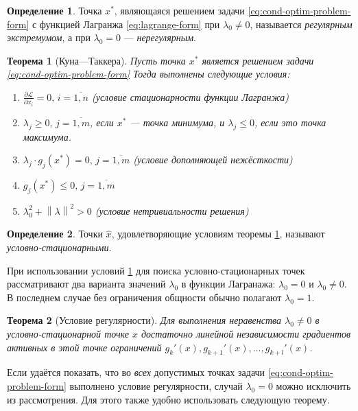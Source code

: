 \documentclass{article}
\renewcommand{\leq}{\leqslant}
\renewcommand{\geq}{\geqslant}
\providecommand{\La}{\mathcal{L}}
\providecommand{\pardiff}[2]{\frac{\partial{#1}}{\partial{#2}}}
\providecommand{\norm}[1]{\left \lVert{#1}\right \rVert}
\newtheorem{thm}{Теорема}[section]
\theoremstyle{remark}
\theoremstyle{definition}
\newtheorem{dfn}{Определение}[section]
\numberwithin{equation}{section}
\begin{document}
\begin{dfn}
  Точка $x^*$, являющаяся решением задачи
  \eqref{eq:cond-optim-problem-form} с функцией Лагранжа
  \eqref{eq:lagrange-form} при $\lambda_0 \neq 0$, называется
  \emph{регулярным экстремумом}, а при $\lambda_0 = 0$ —
  \emph{нерегулярным}.
\end{dfn}

\begin{thm}[Куна—Таккера]
  \label{th:kuhn-tucker}
  Пусть точка $x^*$ является решением задачи
  \eqref{eq:cond-optim-problem-form} Тогда выполнены следующие
  условия:
  \begin{enumerate}
    \renewcommand{\labelenumi}{\emph{\asbuk{enumi})}}
  \item $\pardiff{\La}{x_i}=0,\, i=\overline{1,n}$ (условие
    стационарности функции Лагранжа)
  \item $\lambda_j \geq 0,\, j=\overline{1,m}$, если $x^*$ — точка
    минимума, и $\lambda_j \leq 0$, если это точка максимума.
  \item $\lambda_j \cdot g_j(x^*) = 0,\, j=\overline{1,m}$ (условие
    дополняющей нежёсткости)
  \item $g_j(x^*) \leq 0,\, j=\overline{1,m}$
  \item $\lambda_0^2 + \norm{\lambda}^2 > 0$ (условие нетривиальности решения)
  \end{enumerate}
\end{thm}

\begin{dfn}
  Точки $\hat{x}$, удовлетворяющие условиям теоремы
  \ref{th:kuhn-tucker}, называют \emph{условно-стационарными}.
\end{dfn}

При использовании условий \ref{th:kuhn-tucker} для поиска
условно-стационарных точек рассматривают два варианта значений
$\lambda_0$ в функции Лагранажа: $\lambda_0=0$ и $\lambda_0 \neq 0$. В
последнем случае без ограничения общности обычно полагают $\lambda_0 =
1$.

\begin{thm}[Условие регулярности]
  Для выполнения неравенства $\lambda_0 \neq 0$ в условно-стационарной
  точке $\hat{x}$ достаточно линейной независимости градиентов
  активных в этой точке ограничений $g_k'(x), g_{k+1}'(x), \dotsc,
  g_{k+l}'(x)$.
\end{thm}

Если удаётся показать, что во \emph{всех} допустимых точках задачи
\eqref{eq:cond-optim-problem-form} выполнено условие регулярности,
случай $\lambda_0=0$ можно исключить из рассмотрения. Для этого также
удобно использовать следующую теорему.
\end{document}

